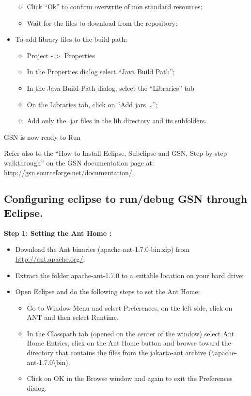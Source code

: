 \begin{itemize}
\begin{itemize}
	\item Click \textquotedblleft{}Ok\textquotedblright{} to confirm overwrite
of non standard resources;
	\item Wait for the files to download from the repository;
\end{itemize}

	\item To add library files to the build path:
\begin{itemize}
	\item Project -\begin{math}>\end{math} Properties
	\item In the Properties dialog select \textquotedblleft{}Java Build
Path\textquotedblright{};
	\item In the Java Build Path dialog, select the
\textquotedblleft{}Libraries\textquotedblright{} tab
	\item On the Libraries tab, click on \textquotedblleft{}Add jars
\ldots{}\textquotedblright{};
	\item Add only the .jar files in the lib directory and its subfolders.
\end{itemize}

\end{itemize}

GSN is now ready to Run

Refer also to the \textquotedblleft{}How to Install Eclipse, Subclipse
and GSN, Step-by-step walkthrough\textquotedblright{} on the GSN
documentation page at: http://gsn.sourceforge.net/documentation/.

\subsection{Configuring eclipse to run/debug GSN through Eclipse.}

\textbf{Step 1: Setting the Ant Home :}

\begin{itemize}
	\item Download the Ant binaries (apache-ant-1.7.0-bin.zip) from
\url{http://ant.apache.org/};
	\item Extract the folder apache-ant-1.7.0 to a suitable location on your
hard drive;
	\item Open Eclipse and do the following steps to set the Ant Home:
\begin{itemize}
	\item Go to Window Menu and select Preferences, on the left side, click on
ANT and then select Runtime.
	\item In the Classpath tab (opened on the center of the window) select Ant
Home Entries, click on the Ant Home button and browse toward the
directory that contains the files from the jakarta-ant archive
(\textbackslash apache-ant-1.7.0\textbackslash bin).
	\item Click on OK in the Browse window and again to exit the Preferences
dialog.
\end{itemize}

\end{itemize}

